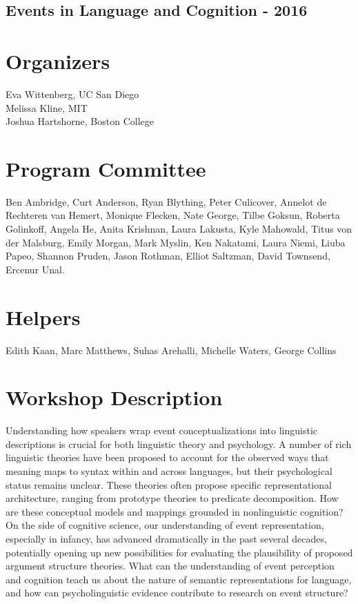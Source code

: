 \documentclass[12pt]{article}
\begin{document}
\begin{titlepage}
    \vspace*{\fill}
    \begin{center}
        \section*{Events in Language and Cognition - 2016}
    \end{center}
    \vspace*{\fill}
\end{titlepage}
\newpage

\section*{Organizers}

Eva Wittenberg, UC San Diego  \\
Melissa Kline, MIT \\
Joshua Hartshorne, Boston College 

\section*{Program Committee}

Ben Ambridge,
Curt Anderson,
Ryan Blything,
Peter Culicover,
Annelot de Rechteren van Hemert,
Monique Flecken,
Nate George,
Tilbe Goksun,
Roberta Golinkoff,
Angela He,
Anita Krishnan,
Laura Lakusta,
Kyle Mahowald,
Titus von der Malsburg,
Emily Morgan,
Mark Myslin,
Ken Nakatami,
Laura Niemi,
Liuba Papeo,
Shannon Pruden,
Jason Rothman,
Elliot Saltzman,
David Townsend,
Ercenur Unal.

\section*{Helpers}
Edith Kaan, Marc Matthews, Suhas Arehalli, Michelle Waters, George Collins

\newpage
\section*{Workshop Description}

Understanding how speakers wrap event conceptualizations into linguistic descriptions is crucial for both linguistic theory and psychology. A number of rich linguistic theories have been proposed to account for the observed ways that meaning maps to syntax within and across languages, but their psychological status remains unclear. These theories often propose specific representational architecture, ranging from prototype theories to predicate decomposition. How are these conceptual models and mappings grounded in non­linguistic cognition? On the side of cognitive science, our understanding of event representation, especially in infancy, has advanced dramatically in the past several decades, potentially opening up new possibilities for evaluating the plausibility of proposed argument structure theories. What can the understanding of event perception and cognition teach us about the nature of semantic representations for language, and how can psycholinguistic evidence contribute to research on event structure?
\end{document}
